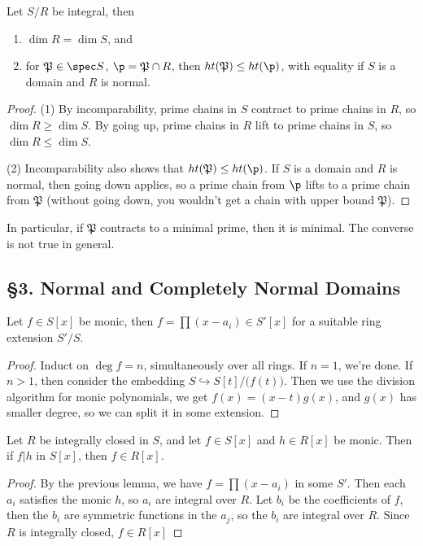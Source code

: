  \begin{theorem}
   Let $S/R$ be integral, then
   \begin{enumerate}
     \item $\dim R = \dim S$, and
     \item for $\mathfrak{P}\in \spec S$, $\p=\mathfrak{P}\cap R$, then
     $ht(\mathfrak{P})\le ht(\p)$, with equality if $S$ is a domain and $R$ is normal.
   \end{enumerate}
 \end{theorem}
 \begin{proof}
   (1) By incomparability, prime chains in $S$ contract to prime chains in $R$, so $\dim
   R\ge \dim S$. By going up, prime chains in $R$ lift to prime chains in $S$, so $\dim
   R\le \dim S$.

   (2) Incomparability also shows that $ht(\mathfrak{P})\le ht(\p)$. If $S$ is a domain
   and $R$ is normal, then going down applies, so a prime chain from $\p$ lifts to a
   prime chain from $\mathfrak{P}$ (without going down, you wouldn't get a chain with
   upper bound $\mathfrak{P}$).
 \end{proof}
 In particular, if $\mathfrak{P}$ contracts to a minimal prime, then it is minimal. The
 converse is not true in general.

 \subsection{\S 3. Normal and Completely Normal Domains}
 \begin{lemma}
   Let $f\in S[x]$ be monic, then $f=\prod (x-a_i)\in S'[x]$ for a suitable ring
   extension $S'/S$.
 \end{lemma}
 \begin{proof}
   Induct on $\deg f=n$, simultaneously over all rings. If $n=1$, we're done. If $n>1$,
   then consider the embedding $S\hookrightarrow S[t]/\bigl(f(t)\bigr)$. Then we use the
   division algorithm for monic polynomials, we get $f(x)=(x-t)g(x)$, and $g(x)$ has
   smaller degree, so we can split it in some extension.
 \end{proof}
 \begin{lemma}
   Let $R$ be integrally closed in $S$, and let $f\in S[x]$ and $h\in R[x]$ be monic.
   Then if $f|h$ in $S[x]$, then $f\in R[x]$.
 \end{lemma}
 \begin{proof}
   By the previous lemma, we have $f=\prod (x-a_i)$ in some $S'$. Then each $a_i$
   satisfies the monic $h$, so $a_i$ are integral over $R$. Let $b_i$ be the coefficients
   of $f$, then the $b_i$ are symmetric functions in the $a_j$, so the $b_i$ are integral
   over $R$. Since $R$ is integrally closed, $f\in R[x]$
 \end{proof}
 \setcounter{lecture}{26}
